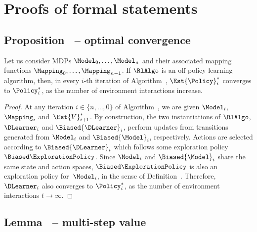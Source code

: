 
\section{Proofs of formal statements}

\subsection{Proposition~ -- optimal convergence}

\begin{propositionmain}{}
	Let us consider MDPs $\Model_0, \dots, \Model_{n}$ and their associated mapping functions $\Mapping_0, \dots, \Mapping_{n-1}$.
	If $\RlAlgo$ is an off-policy learning algorithm, then,
	in every $i$-th iteration of Algorithm~, $\Est{\Policy}^*_i$ converges to $\Policy^*_i$,
	as the number of environment interactions increase.
\end{propositionmain}
\begin{proof}
	At any iteration $i \in \{n, \dots, 0\}$ of Algorithm~,
	we are given $\Model_i$, $\Mapping_i$ and~$\Est{V}_{i+1}^*$.
	By construction, the two instantiations of $\RlAlgo$, $\DLearner_i$ and $\Biased{\DLearner}_i$,
	perform updates from transitions generated from $\Model_i$ and $\Biased{\Model}_i$, respectively.
	Actions are selected according to $\Biased{\DLearner}_i$ which follows some exploration policy $\Biased\ExplorationPolicy$.
	Since $\Model_i$ and $\Biased{\Model}_i$ share the same state and action spaces,
	$\Biased\ExplorationPolicy$ is also an exploration policy for~$\Model_i$, in the sense of Definition~.
	Therefore, ${\DLearner}_i$ also converges to $\Policy^*_i$, as the number of environment interactions $t \to \infty$.
\end{proof}


\subsection{Lemma~ -- multi-step value}

